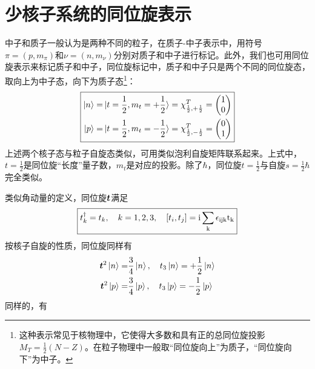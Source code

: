 \section{少核子系统的同位旋表示}
中子和质子一般认为是两种不同的粒子，在质子-中子表示中，用符号$\pi = (p, m_\pi)$和$\nu = (n, m_\nu)$分别对质子和中子进行标记。此外，我们也可用同位旋表示来标记质子和中子，同位旋标记中，质子和中子只是两个不同的同位旋态，取向上为中子态，向下为质子态\footnote{这种表示常见于核物理中，它使得大多数和具有正的总同位旋投影$M_{T} = \frac{1}{2}(N - Z)$。在粒子物理中一般取“同位旋向上”为质子，“同位旋向下”为中子。}：
\begin{equation}
    \boxed{
        \begin{aligned}
            \ket{n} =& \ket{t = \frac{1}{2}, m_{t} = +\frac{1}{2}} = \chi_{\frac{1}{2}, +\frac{1}{2}}^{T} = \begin{pmatrix}
                1 \\
                0
            \end{pmatrix} \\
            \ket{p} =& \ket{t = \frac{1}{2}, m_{t} = -\frac{1}{2}} = \chi_{\frac{1}{2}, -\frac{1}{2}}^{T} = \begin{pmatrix}
                0 \\
                1
            \end{pmatrix}
        \end{aligned}
    }
\end{equation}
上述两个核子态与粒子自旋态类似，可用类似泡利自旋矩阵联系起来。上式中，$t = \frac{1}{2}$是同位旋“长度”量子数，$m_{t}$是对应的投影。除了$\hbar$，同位旋$t = \frac{1}{2}$与自旋$s = \frac{1}{2}\hbar$完全类似。

类似角动量的定义，同位旋$\bm{t}$满足
\begin{equation}
    \boxed{
        t^{\dagger}_{k} = t_k, \quad k = 1, 2, 3,\quad \left[t_i, t_j\right] = \rm{i} \sum_{k}\epsilon_{ijk}t_{k}
    }
\end{equation}
按核子自旋的性质，同位旋同样有
\begin{align}
    \bm{t}^2 \ket{n} =& \frac{3}{4} \ket{n}, \quad t_3\ket{n} = +\frac{1}{2} \ket{n} \\
    \bm{t}^2 \ket{p} =& \frac{3}{4} \ket{p}, \quad t_3\ket{p} = -\frac{1}{2} \ket{p}
\end{align}
同样的，有



